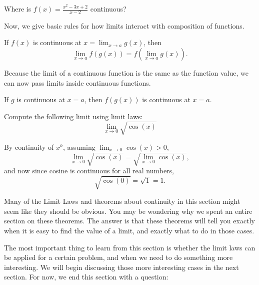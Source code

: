 \documentclass{ximera}
\begin{document}
\begin{question}
  Where is $f(x) = \frac{x^2-3x+2}{x-2}$ continuous?
  \begin{multipleChoice}
  \end{multipleChoice}
\end{question}


Now, we give basic rules for how limits interact with composition
of functions.

\begin{theorem}
  If $f(x)$ is continuous at $x = \displaystyle\lim_{x\to a} g(x)$, then
  \[
  \displaystyle\lim_{x\to a} f(g(x)) = f(\displaystyle\lim_{x\to a} g(x)).
  \]
\end{theorem}

Because the limit of a continuous function is the same as the function
value, we can now pass limits inside continuous functions.

\begin{corollary}
If $g$ is continuous at $x=a$, then $f(g(x))$ is continuous at $x=a$.
\end{corollary}

\begin{example}
  Compute the following limit using limit laws:
  \[
  \displaystyle\lim_{x \to 0} \sqrt{\cos(x)}
  \]
  \begin{explanation}
    By continuity of $x^k$, assuming $\displaystyle\lim_{x \to 0} \cos(x) >0$,
    \[
    \displaystyle\lim_{x \to 0} \sqrt{\cos(x)} = \sqrt{\displaystyle\lim_{x \to 0} \cos(x)},
    \]
    and now since cosine is continuous for all real numbers,
    \[
    \sqrt{\cos(0)} = \sqrt{1} = 1.
    \]
  \end{explanation}
\end{example}

Many of the Limit Laws and theorems about continuity in this section
might seem like they should be obvious.  You may be wondering why we
spent an entire section on these theorems.  The answer is that these
theorems will tell you exactly when it is easy to find the value of a
limit, and exactly what to do in those cases.

The most important thing to learn from this section is whether the
limit laws can be applied for a certain problem, and when we need to
do something more interesting.  We will begin discussing those more
interesting cases in the next section.  For now, we end this section
with a question:
\end{document}
